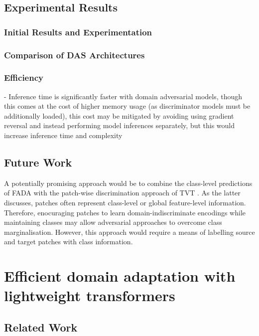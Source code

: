 \documentclass[a4paper,12pt]{report}
\begin{document}

\section{Experimental Results}

\subsection{Initial Results and Experimentation}
\subsection{Comparison of DAS Architectures}
\subsection{Efficiency}
- Inference time is significantly faster with domain adversarial models, though this comes at the cost of higher memory usage (as discriminator models must be additionally loaded), this cost may be mitigated by avoiding using gradient reversal and instead performing model inferences separately, but this would increase inference time and complexity

\section{Future Work}
A potentially promising approach would be to combine the class-level predictions of FADA \cite{wang_classes_2020} with the patch-wise discrimination approach of TVT \cite{yang_tvt_2021}. As the latter discusses, patches often represent class-level or global feature-level information. Therefore, enocuraging patches to learn domain-indiscriminate encodings while maintaining classes may allow adversarial approaches to overcome class marginalisation. However, this approach would require a means of labelling source and target patches with class information.

\chapter{Efficient domain adaptation with lightweight transformers}

\section{Related Work}
\end{document}
